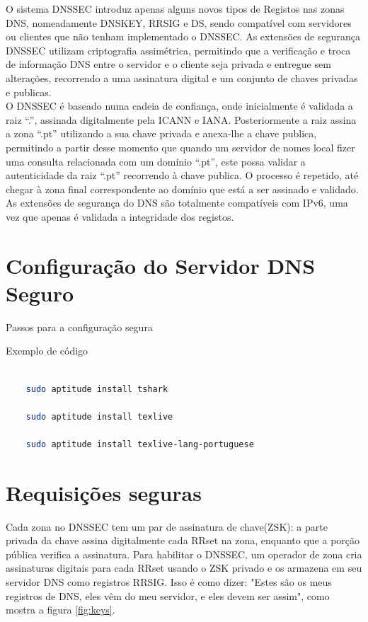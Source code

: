 \documentclass[12pt,openright,a4paper]{report}
\begin{document}
{O sistema DNSSEC introduz apenas alguns novos tipos de Registos nas zonas DNS, nomeadamente DNSKEY, RRSIG e DS, sendo compatível com servidores ou clientes que não tenham implementado o DNSSEC. As extensões de segurança DNSSEC utilizam criptografia assimétrica, permitindo que a verificação e troca de informação DNS entre o servidor e o cliente seja privada e entregue sem alterações, recorrendo a uma assinatura digital e um conjunto de chaves privadas e publicas.\\

O DNSSEC é baseado numa cadeia de confiança, onde inicialmente é validada a raiz “.”, assinada digitalmente pela ICANN e IANA. Posteriormente a raiz assina a zona “.pt” utilizando a sua chave privada e anexa-lhe a chave publica, permitindo a partir desse momento que quando um servidor de nomes local fizer uma consulta relacionada com um domínio “.pt”, este possa validar a autenticidade da raiz “.pt” recorrendo à chave publica. O processo é repetido, até chegar à zona final correspondente ao domínio que está a ser assinado e validado. As extensões de segurança do DNS são totalmente compatíveis com IPv6, uma vez que apenas é validada a integridade dos registos.

\section{Configuração do Servidor DNS Seguro}
\label{sec_config_segura}

Passos para a configuração segura

Exemplo de código
\begin{lstlisting}[language=bash]

	sudo aptitude install tshark

	sudo aptitude install texlive

	sudo aptitude install texlive-lang-portuguese

\end{lstlisting}

\section{Requisições seguras}
\label{sec_req_seguras}

Cada zona no DNSSEC tem um par de assinatura de chave(ZSK): a parte privada da chave assina digitalmente cada RRset na zona, enquanto que a porção pública verifica a assinatura. Para habilitar o DNSSEC, um operador de zona cria assinaturas digitais para cada RRset usando o ZSK privado e os armazena em seu servidor DNS como registros RRSIG. Isso é como dizer: "Estes são os meus registros de DNS, eles vêm do meu servidor, e eles devem ser assim", como mostra a figura \ref{fig:keys}.

}
\end{document}

